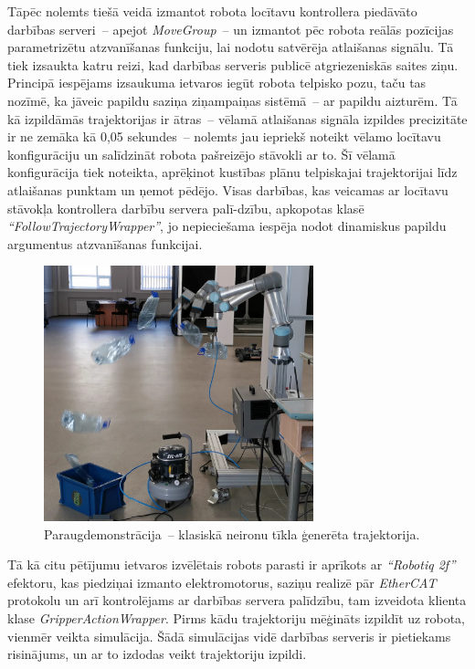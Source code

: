 \documentclass[12pt, a4paper]{article}
\numberwithin{equation}{section} %
\begin{document}
Tāpēc nolemts tiešā veidā izmantot robota locītavu kontrollera piedāvāto darbības serveri~-- apejot \textit{MoveGroup}~-- un izmantot pēc robota reālās pozīcijas parametrizētu atzvanīšanas funkciju, lai nodotu satvērēja atlaišanas signālu. Tā tiek izsaukta katru reizi, kad darbības serveris publicē atgriezeniskās saites ziņu. Principā iespējams izsaukuma ietvaros iegūt robota telpisko pozu, taču tas nozīmē, ka jāveic papildu saziņa ziņampaiņas sistēmā~-- ar papildu aizturēm. Tā kā izpildāmās trajektorijas ir ātras~-- vēlamā atlaišanas signāla izpildes precizitāte ir ne zemāka kā 0,05 sekundes~-- nolemts jau iepriekš noteikt vēlamo locītavu konfigurāciju un salīdzināt robota pašreizējo stāvokli ar to. Šī vēlamā konfigurācija tiek noteikta, aprēķinot kustības plānu telpiskajai trajektorijai līdz atlaišanas punktam un ņemot pēdējo. Visas darbības, kas veicamas ar locītavu stāvokļa kontrollera darbību servera palī-dzību, apkopotas klasē \textit{``FollowTrajectoryWrapper''}, jo nepieciešama iespēja nodot dinamiskus papildu argumentus atzvanīšanas funkcijai. 

\begin{figure}[t!]
    \centering
    \includegraphics[height=7.4cm,page=1]{../img/action_sequence.png}
    \caption{Paraugdemonstrācija~-- klasiskā neironu tīkla ģenerēta trajektorija.}
\end{figure}


Tā kā citu pētījumu ietvaros izvēlētais robots parasti ir aprīkots ar \textit{``Robotiq 2f''} efektoru, kas piedziņai izmanto elektromotorus, saziņu realizē pār \textit{EtherCAT} protokolu un arī kontrolējams ar darbības servera palīdzību, tam izveidota klienta klase \textit{GripperActionWrapper}. Pirms kādu trajektoriju mēģināts izpildīt uz robota, vienmēr veikta simulācija. Šādā simulācijas vidē darbības serveris ir pietiekams risinājums, un ar to izdodas veikt trajektoriju izpildi.
\end{document}
